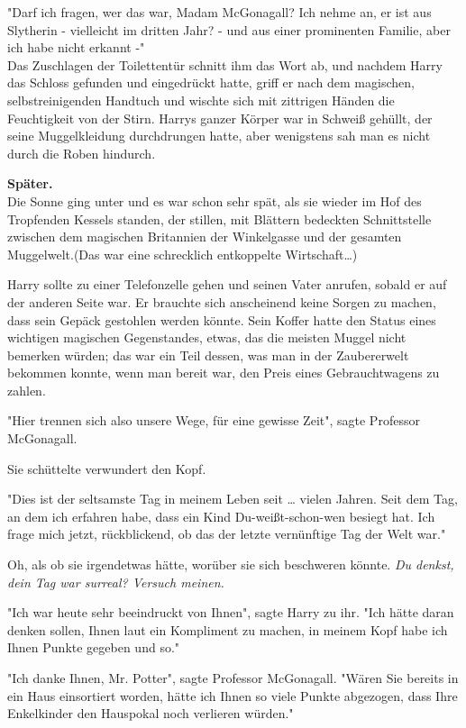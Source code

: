 {"Darf ich fragen, wer das war, Madam McGonagall? Ich nehme an, er ist aus Slytherin - vielleicht im dritten Jahr? - und aus einer prominenten Familie, aber ich habe nicht erkannt -"\\ Das Zuschlagen der Toilettentür schnitt ihm das Wort ab, und nachdem Harry das Schloss gefunden und eingedrückt hatte, griff er nach dem magischen, selbstreinigenden Handtuch und wischte sich mit zittrigen Händen die Feuchtigkeit von der Stirn. Harrys ganzer Körper war in Schweiß gehüllt, der seine Muggelkleidung durchdrungen hatte, aber wenigstens sah man es nicht durch die Roben hindurch.

\textbf{Später.}\\ Die Sonne ging unter und es war schon sehr spät, als sie wieder im Hof des Tropfenden Kessels standen, der stillen, mit Blättern bedeckten Schnittstelle zwischen dem magischen Britannien der Winkelgasse und der gesamten Muggelwelt.(Das war eine schrecklich entkoppelte Wirtschaft…)

Harry sollte zu einer Telefonzelle gehen und seinen Vater anrufen, sobald er auf der anderen Seite war. Er brauchte sich anscheinend keine Sorgen zu machen, dass sein Gepäck gestohlen werden könnte. Sein Koffer hatte den Status eines wichtigen magischen Gegenstandes, etwas, das die meisten Muggel nicht bemerken würden; das war ein Teil dessen, was man in der Zaubererwelt bekommen konnte, wenn man bereit war, den Preis eines Gebrauchtwagens zu zahlen.

"Hier trennen sich also unsere Wege, für eine gewisse Zeit", sagte Professor McGonagall.

Sie schüttelte verwundert den Kopf.

"Dies ist der seltsamste Tag in meinem Leben seit … vielen Jahren. Seit dem Tag, an dem ich erfahren habe, dass ein Kind Du-weißt-schon-wen besiegt hat. Ich frage mich jetzt, rückblickend, ob das der letzte vernünftige Tag der Welt war."

Oh, als ob sie irgendetwas hätte, worüber sie sich beschweren könnte. \emph{Du denkst, dein Tag war surreal? Versuch meinen.}

"Ich war heute sehr beeindruckt von Ihnen", sagte Harry zu ihr. "Ich hätte daran denken sollen, Ihnen laut ein Kompliment zu machen, in meinem Kopf habe ich Ihnen Punkte gegeben und so."

"Ich danke Ihnen, Mr. Potter", sagte Professor McGonagall. "Wären Sie bereits in ein Haus einsortiert worden, hätte ich Ihnen so viele Punkte abgezogen, dass Ihre Enkelkinder den Hauspokal noch verlieren würden."

}
